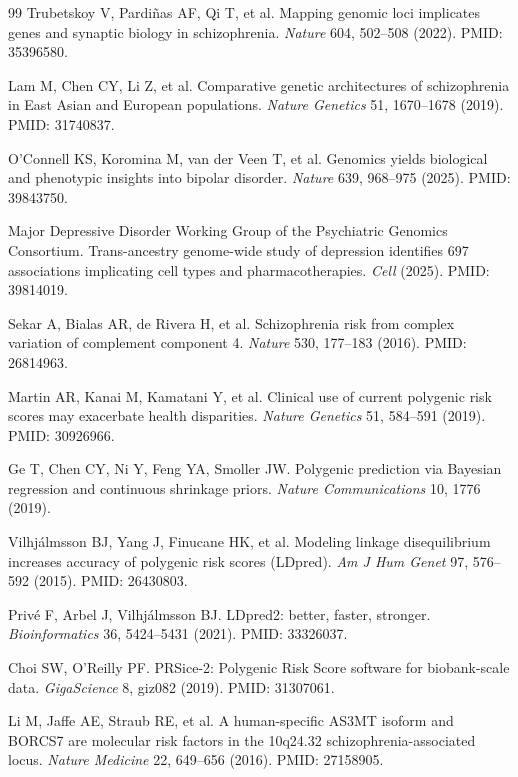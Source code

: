 \documentclass[11pt,a4paper]{article}
\begin{document}
\begin{thebibliography}{99}
\small
{} Trubetskoy V, Pardiñas AF, Qi T, et al. Mapping genomic loci implicates genes and synaptic biology in schizophrenia. \emph{Nature} 604, 502--508 (2022). PMID: 35396580.

 Lam M, Chen CY, Li Z, et al. Comparative genetic architectures of schizophrenia in East Asian and European populations. \emph{Nature Genetics} 51, 1670--1678 (2019). PMID: 31740837.

 O'Connell KS, Koromina M, van der Veen T, et al. Genomics yields biological and phenotypic insights into bipolar disorder. \emph{Nature} 639, 968--975 (2025). PMID: 39843750.

 Major Depressive Disorder Working Group of the Psychiatric Genomics Consortium. Trans-ancestry genome-wide study of depression identifies 697 associations implicating cell types and pharmacotherapies. \emph{Cell} (2025). PMID: 39814019.

 Sekar A, Bialas AR, de Rivera H, et al. Schizophrenia risk from complex variation of complement component 4. \emph{Nature} 530, 177--183 (2016). PMID: 26814963.

 Martin AR, Kanai M, Kamatani Y, et al. Clinical use of current polygenic risk scores may exacerbate health disparities. \emph{Nature Genetics} 51, 584--591 (2019). PMID: 30926966.

 Ge T, Chen CY, Ni Y, Feng YA, Smoller JW. Polygenic prediction via Bayesian regression and continuous shrinkage priors. \emph{Nature Communications} 10, 1776 (2019).

 Vilhjálmsson BJ, Yang J, Finucane HK, et al. Modeling linkage disequilibrium increases accuracy of polygenic risk scores (LDpred). \emph{Am J Hum Genet} 97, 576--592 (2015). PMID: 26430803.

 Privé F, Arbel J, Vilhjálmsson BJ. LDpred2: better, faster, stronger. \emph{Bioinformatics} 36, 5424--5431 (2021). PMID: 33326037.

 Choi SW, O'Reilly PF. PRSice-2: Polygenic Risk Score software for biobank-scale data. \emph{GigaScience} 8, giz082 (2019). PMID: 31307061.

 Li M, Jaffe AE, Straub RE, et al. A human-specific AS3MT isoform and BORCS7 are molecular risk factors in the 10q24.32 schizophrenia-associated locus. \emph{Nature Medicine} 22, 649--656 (2016). PMID: 27158905.


\end{thebibliography}
\end{document}
